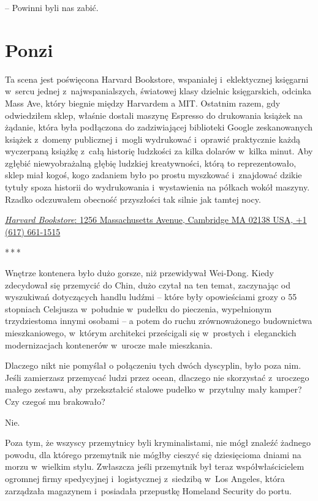 \documentclass[oneside,polish,11pt,rmheadings]{mwbk}
\newcommand{\threeast}{\par\centerline{*\,*\,*}\medskip\par}
\begin{document}
-- Powinni byli nas zabić.


\chapter{Ponzi}

Ta scena jest poświęcona Harvard Bookstore, wspaniałej i~eklektycznej księgarni w~sercu jednej z~najwspanialszych, światowej klasy dzielnic księgarskich, odcinka Mass Ave, który biegnie między Harvardem a MIT. Ostatnim razem, gdy odwiedziłem sklep, właśnie dostali maszynę Espresso do drukowania książek na żądanie, która była podłączona do zadziwiającej biblioteki Google zeskanowanych książek z~domeny publicznej i~mogli wydrukować i~oprawić praktycznie każdą wyczerpaną książkę z~całą historię ludzkości za kilka dolarów w~kilka minut. Aby zgłębić niewyobrażalną głębię ludzkiej kreatywności, którą to reprezentowało, sklep miał kogoś, kogo zadaniem było po prostu myszkować i~znajdować dzikie tytuły spoza historii do wydrukowania i~wystawienia na półkach wokół maszyny. Rzadko odczuwałem obecność przyszłości tak silnie jak tamtej nocy.

\href{https://www.harvard.com/}{\textit{Harvard Bookstore}: 1256 Massachusetts Avenue, Cambridge MA 02138 USA, +1 (617) 661-1515} 

\bigskip
\threeast

Wnętrze kontenera było dużo gorsze, niż przewidywał Wei-Dong. Kiedy zdecydował się przemycić do Chin, dużo czytał na ten temat, zaczynając od wyszukiwań dotyczących handlu ludźmi -- które były opowieściami grozy o 55 stopniach Celsjusza w~południe w~pudełku do pieczenia, wypełnionym trzydziestoma innymi osobami -- a potem do ruchu zrównoważonego budownictwa mieszkaniowego, w~którym architekci prześcigali się w~prostych i~eleganckich modernizacjach kontenerów w~urocze małe mieszkania.

Dlaczego nikt nie pomyślał o połączeniu tych dwóch dyscyplin, było poza nim. Jeśli zamierzasz przemycać ludzi przez ocean, dlaczego nie skorzystać z~uroczego małego zestawu, aby przekształcić stalowe pudełko w~przytulny mały kamper? Czy czegoś mu brakowało?

Nie. 

Poza tym, że wszyscy przemytnicy byli kryminalistami, nie mógł znaleźć żadnego powodu, dla którego przemytnik nie mógłby cieszyć się dziesięcioma dniami na morzu w~wielkim stylu. Zwłaszcza jeśli przemytnik był teraz współwłaścicielem ogromnej firmy spedycyjnej i~logistycznej z~siedzibą w~Los Angeles, która zarządzała magazynem i~posiadała przepustkę Homeland Security do portu.
\end{document}
